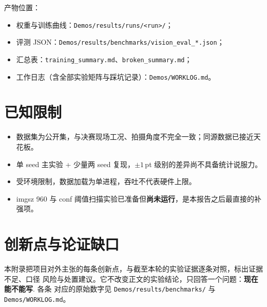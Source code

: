 \documentclass[UTF8,a4paper,11pt]{ctexart}
\begin{document}
\noindent 产物位置：
\begin{itemize}
  \item 权重与训练曲线：\texttt{Demos/results/runs/<run>/}；
  \item 评测 JSON：\texttt{Demos/results/benchmarks/vision\_eval\_*.json}；
  \item 汇总表：\texttt{training\_summary.md}、\texttt{broken\_summary.md}；
  \item 工作日志（含全部实验矩阵与踩坑记录）：\texttt{Demos/WORKLOG.md}。
\end{itemize}

\section{已知限制}

\begin{itemize}
  \item 数据集为公开集，与决赛现场工况、拍摄角度不完全一致；同源数据已接近天花板。
  \item 单 seed 主实验 + 少量两 seed 复现，$\pm1$\,pt 级别的差异尚不具备统计说服力。
  \item 受环境限制，数据加载为单进程，吞吐不代表硬件上限。
  \item imgsz 960 与 conf 阈值扫描实验已准备但\textbf{尚未运行}，是本报告之后最直接的补强项。
\end{itemize}

\clearpage
\appendix
\section{创新点与论证缺口}

本附录把项目对外主张的每条创新点，与截至本轮的实验证据逐条对照，标出证据不足、口径
风险与处置建议。它不改变正文的实验结论，只回答一个问题：\textbf{现在能不能写}. 各条
对应的原始数字见 \texttt{Demos/results/benchmarks/} 与 \texttt{Demos/WORKLOG.md}。
\end{document}
